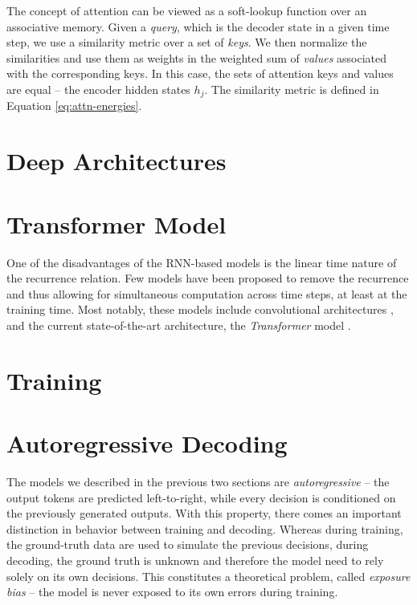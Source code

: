 The concept of attention can be viewed as a soft-lookup function over an
associative memory. Given a \emph{query}, which is the decoder state in a given
time step, we use a similarity metric over a set of \emph{keys}. We then
normalize the similarities and use them as weights in the weighted sum of
\emph{values} associated with the corresponding keys. In this case, the sets of
attention keys and values are equal -- the encoder hidden states $h_j$. The
similarity metric is defined in Equation \ref{eq:attn-energies}.


\section{Deep Architectures}
\label{sec:deep-arch}


\section{Transformer Model}
\label{sec:transformer}

One of the disadvantages of the RNN-based models is the linear time nature of
the recurrence relation. Few models have been proposed to remove the recurrence
and thus allowing for simultaneous computation across time steps, at least at
the training time. Most notably, these models include convolutional
architectures \citep{gehring2017convolutional}, and the current state-of-the-art
architecture, the \emph{Transformer} model \citep{vaswani2017attention}.


\section{Training}
\label{sec:training}


\section{Autoregressive Decoding}
\label{sec:training-vs-inference}

The models we described in the previous two sections are \emph{autoregressive}
-- the output tokens are predicted left-to-right, while every decision is
conditioned on the previously generated outputs. With this property, there comes
an important distinction in behavior between training and decoding. Whereas
during training, the ground-truth data are used to simulate the previous
decisions, during decoding, the ground truth is unknown and therefore the model
need to rely solely on its own decisions. This constitutes a theoretical
problem, called \emph{exposure bias} -- the model is never exposed to its own
errors during training.

